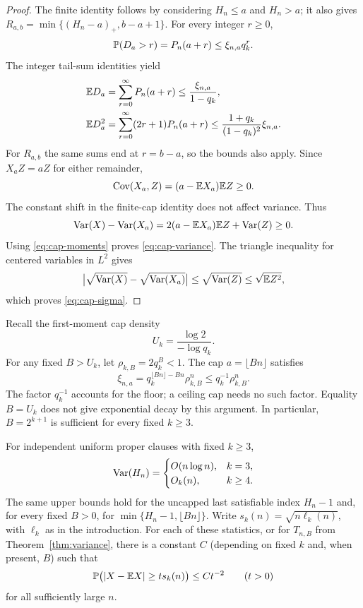\begin{proof}
The finite identity follows by considering $H_n\le a$ and $H_n>a$;
it also gives $R_{a,b}=\min\{(H_n-a)_+,b-a+1\}$.
For every integer $r\ge0$,
\[
 \mathbb P(D_a>r)=P_n(a+r)\le\xi_{n,a}q_k^r.
\]
The integer tail-sum identities yield
\begin{align*}
 \mathbb E D_a&=\sum_{r=0}^{\infty}P_n(a+r)
       \le\frac{\xi_{n,a}}{1-q_k},\\
 \mathbb E D_a^2&=\sum_{r=0}^{\infty}(2r+1)P_n(a+r)
       \le\frac{1+q_k}{(1-q_k)^2}\xi_{n,a}.
\end{align*}
For $R_{a,b}$ the same sums end at $r=b-a$, so the bounds also apply.
Since $X_aZ=aZ$ for either remainder,
\[
 \operatorname{Cov}(X_a,Z)=(a-\mathbb E X_a)\mathbb E Z\ge0.
\]
The constant shift in the finite-cap identity does not affect variance.
Thus
\[
 \operatorname{Var}(X)-\operatorname{Var}(X_a)
 =2(a-\mathbb E X_a)\mathbb E Z+\operatorname{Var}(Z)\ge0.
\]
Using \eqref{eq:cap-moments} proves \eqref{eq:cap-variance}.
The triangle inequality for centered variables in $L^2$ gives
\[
 \bigl|\sqrt{\operatorname{Var}(X)}-\sqrt{\operatorname{Var}(X_a)}\bigr|
 \le\sqrt{\operatorname{Var}(Z)}\le\sqrt{\mathbb E Z^2},
\]
which proves \eqref{eq:cap-sigma}.
\end{proof}

Recall the first-moment cap density
\begin{equation}\label{eq:sufficient-cap}
 U_k=\frac{\log2}{-\log q_k}.
\end{equation}
For any fixed $B>U_k$, let
$\rho_{k,B}=2q_k^B<1$. The cap $a=\lfloor Bn\rfloor$ satisfies
\begin{equation}\label{eq:cap-rounding}
 \xi_{n,a}=q_k^{\lfloor Bn\rfloor-Bn}\rho_{k,B}^n
 \le q_k^{-1}\rho_{k,B}^n.
\end{equation}
The factor $q_k^{-1}$ accounts for the floor; a ceiling cap needs no such
factor. Equality $B=U_k$ does not give exponential decay by
this argument. In particular, $B=2^{k+1}$ is sufficient for every fixed
$k\ge3$.

\begin{corollary}
\label{cor:uncapped}
For independent uniform proper clauses with fixed $k\ge3$,
\begin{equation}\label{eq:uncapped-variance}
 \operatorname{Var}(H_n)=
 \begin{cases}
 O(n\log n),&k=3,\\
 O_k(n),&k\ge4.
 \end{cases}
\end{equation}
The same upper bounds hold for the uncapped last satisfiable index
$H_n-1$ and, for every fixed $B>0$, for
$\min\{H_n-1,\lfloor Bn\rfloor\}$.
Write $s_k(n)=\sqrt{n\ell_k(n)}$, with $\ell_k$ as in the
introduction.
For each of these statistics, or for $T_{n,B}$ from
Theorem~\ref{thm:variance}, there is a constant $C$ (depending on fixed
$k$ and, when present, $B$) such that
\begin{equation}\label{eq:mean-centered-concentration}
 \mathbb P\bigl(|X-\mathbb E X|\ge t s_k(n)\bigr)\le C t^{-2}
 \qquad(t>0)
\end{equation}
for all sufficiently large $n$.
\end{corollary}

